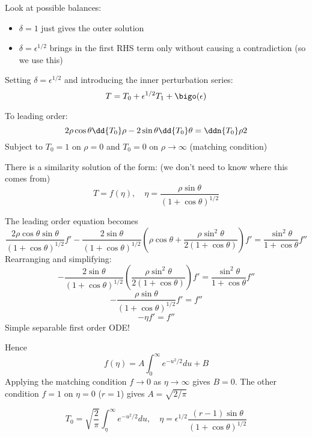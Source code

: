 \documentclass{X:/Documents/Coding/Latex/myassignment}
\begin{document}
Look at possible balances:
\begin{itemize}
    \item $\delta =1$ just gives the outer solution
    \item $\delta= \epsilon^{1/2}$ brings in the first RHS term only without causing a contradiction (so we use this)
\end{itemize}


Setting $\delta=\epsilon^{1/2}$ and introducing the inner perturbation series:
\[T = T_0 + \epsilon^{1/2} T_1 + \bigo(\epsilon)\]

To leading order:
\[2\rho \cos\theta \dd{T_0}\rho - 2\sin\theta \dd{T_0}\theta = \ddn{T_0}\rho 2\]
Subject to $T_0 = 1$ on $\rho=0$ and $T_0=0$ on $\rho\to \infty$ (matching condition)

There is a similarity solution of the form: (we don't need to know where this comes from)
\[T = f(\eta) , \quad \eta = \frac{\rho\sin \theta}{(1+\cos\theta)^{1/2}}\]

The leading order equation becomes
\[\frac{2\rho\cos\theta\sin\theta}{(1+\cos\theta)^{1/2}} f' - \frac{2\sin\theta}{(1+\cos\theta)^{1/2}} \left(\rho \cos\theta + \frac{\rho\sin^2\theta}{2(1+\cos\theta)}\right) f' = \frac{\sin^2\theta}{1+\cos\theta} f''\]
Rearranging and simplifying:
\[- \frac{2\sin\theta}{(1+\cos\theta)^{1/2}} \left(\frac{\rho\sin^2\theta}{2(1+\cos\theta)}\right) f' = \frac{\sin^2\theta}{1+\cos\theta} f''\]
\[-\frac{\rho \sin\theta}{(1+\cos\theta)^{1/2}} f' = f''\]
\[-\eta f' = f''\]
Simple separable first order ODE!

Hence
\[f(\eta) = A\int_0^\infty e^{-u^2/2} du + B\]
Applying the matching condition $f\to 0$ as $\eta \to \infty$ gives $B=0$. The other condition $f=1$ on $\eta =0$ ($r=1$) gives $A = \sqrt{2/\pi}$

\[T_0 = \sqrt{\frac2\pi} \int_\eta^{\infty} e^{-u^2/2} du, \quad \eta = \epsilon^{1/2} \frac{(r-1)\sin\theta}{(1+\cos\theta)^{1/2}}\]


\end{document}
